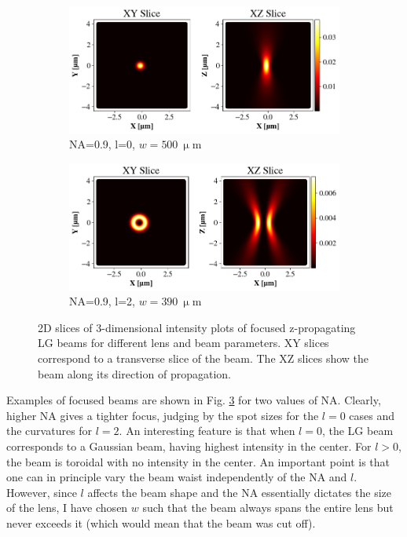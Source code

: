 \begin{figure}[htbp]
    \begin{subfigure}[b]{0.49\textwidth}
        \centering
        \includegraphics[width=\textwidth]{Figures/Efoc_NA9_l0.png} %
        \caption{NA=0.9, l=0, $w=500\ \mathrm{\upmu m}$}
        \label{fig:c}
    \end{subfigure}
    \hfill
    \begin{subfigure}[b]{0.49\textwidth}
        \centering
        \includegraphics[width=\textwidth]{Figures/Efoc_NA9_l2.png} %
        \caption{NA=0.9, l=2, $w=390\ \mathrm{\upmu m}$}
        \label{fig:d}
    \end{subfigure}

    \caption{2D slices of 3-dimensional intensity plots of focused z-propagating LG beams for different lens and beam parameters. XY slices correspond to a transverse slice of the beam. The XZ slices show the beam along its direction of propagation.}
    \label{fig:Efoc}
\end{figure}
Examples of focused beams are shown in Fig. \ref{fig:Efoc} for two values of NA. Clearly, higher NA gives a tighter focus, judging by the spot sizes for the $l=0$ cases and the curvatures for $l=2$. 
An interesting feature is that when $l=0$, the LG beam corresponds to a Gaussian beam, having highest intensity in the center. For $l>0$, the beam is toroidal with no intensity in the center. 
An important point is that one can in principle vary the beam waist independently of the NA and $l$. However, since $l$ affects the beam shape and the NA essentially dictates the size of the lens, I have chosen $w$ such that the beam always spans the entire lens but never exceeds it (which would mean that the beam was cut off).

